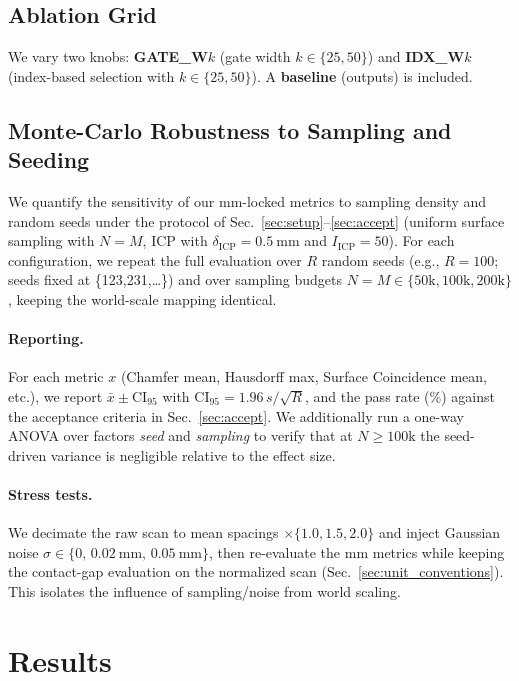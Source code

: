 \documentclass{ieeeaccess}
\begin{document}
\subsection{Ablation Grid}
We vary two knobs: \textbf{GATE\_W$k$} (gate width $k\in\{25,50\}$) and \textbf{IDX\_W$k$} (index-based selection with $k\in\{25,50\}$). A \textbf{baseline} (outputs) is included.

\subsection{Monte-Carlo Robustness to Sampling and Seeding}
\label{sec:robustness}
We quantify the sensitivity of our mm-locked metrics to sampling density and random seeds
under the protocol of Sec.~\ref{sec:setup}--\ref{sec:accept} (uniform surface sampling with $N{=}M$,
ICP with $\delta_{\mathrm{ICP}}{=}\SI{0.5}{\milli\meter}$ and $I_{\mathrm{ICP}}{=}50$). %
For each configuration, we repeat the full evaluation over $R$ random seeds 
(e.g., $R{=}100$; seeds fixed at \{123,231,\dots\}) and over sampling budgets 
$N{=}M \in \{50\mathrm{k}, 100\mathrm{k}, 200\mathrm{k}\}$, keeping the world-scale mapping identical.

\paragraph*{Reporting.}
For each metric $x$ (Chamfer mean, Hausdorff max, Surface Coincidence mean, etc.), 
we report $\bar x \pm \mathrm{CI}_{95}$ with 
$\mathrm{CI}_{95} = 1.96\, s / \sqrt{R}$, and the pass rate (\%) against the acceptance criteria 
in Sec.~\ref{sec:accept}. We additionally run a one-way ANOVA over factors 
\textit{seed} and \textit{sampling} to verify that at $N{\ge}100\mathrm{k}$ the seed-driven variance 
is negligible relative to the effect size.

\paragraph*{Stress tests.}
We decimate the raw scan to mean spacings $\times\{1.0, 1.5, 2.0\}$ and inject 
Gaussian noise $\sigma \in \{0,\,\SI{0.02}{\milli\meter},\,\SI{0.05}{\milli\meter}\}$, 
then re-evaluate the mm metrics while keeping the contact-gap evaluation on the normalized scan 
(Sec.~\ref{sec:unit_conventions}). This isolates the influence of sampling/noise from world scaling.

\section{Results}
\label{sec:results}
\end{document}
